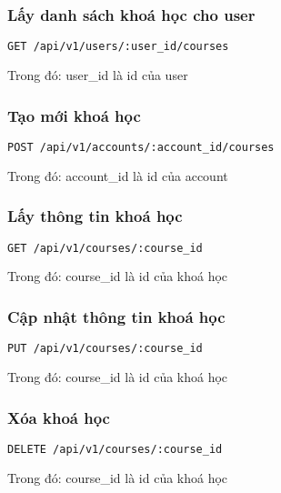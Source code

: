 \documentclass[../Thesis.tex]{subfiles}
\begin{document}
        \subsubsection{Lấy danh sách khoá học cho user}
          \begin{lstlisting}[language=bash]
            GET /api/v1/users/:user_id/courses
          \end{lstlisting}

          Trong đó: user\_id là id của user

        \subsubsection{Tạo mới khoá học}
          \begin{lstlisting}[language=bash]
            POST /api/v1/accounts/:account_id/courses
          \end{lstlisting}

          Trong đó: account\_id là id của account

        \subsubsection{Lấy thông tin khoá học}
          \begin{lstlisting}[language=bash]
            GET /api/v1/courses/:course_id
          \end{lstlisting}

          Trong đó: course\_id là id của khoá học

        \subsubsection{Cập nhật thông tin khoá học}
          \begin{lstlisting}[language=bash]
            PUT /api/v1/courses/:course_id
          \end{lstlisting}

          Trong đó: course\_id là id của khoá học

        \subsubsection{Xóa khoá học}
          \begin{lstlisting}[language=bash]
            DELETE /api/v1/courses/:course_id
          \end{lstlisting}

          Trong đó: course\_id là id của khoá học
\end{document}
